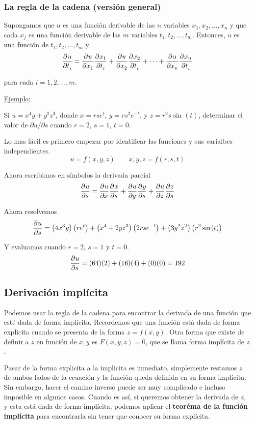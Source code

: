 \documentclass[12pt]{article}
\begin{document}
\subsubsection{La regla de la cadena (versión general)}
Supongamos que $ u $ es una función derivable de las $ n $ variables $ x_{1},x_{2},\dots ,x_{n} $ y que cada $ x_{j} $ es una función derivable de las $ m $ variables $ t_{1},t_{2},\dots ,t_{m} $. Entonces, $ u $ es una función de $ t_{1}, t_{2},\dots,t_{m} $ y
\[
\pdv[]{u}{t_{i}} = \pdv[]{u}{x_{1}}\pdv[]{x_{1}}{t_{i}} + \pdv[]{u}{x_{2}}\pdv[]{x_{2}}{t_{i}} + \dots  + \pdv[]{u}{x_{n}}\pdv[]{x_{n}}{t_{i}}
\]

para cada $ i=1,2,\dots ,m $.

\underline{Ejemplo:}

Si $ u=x^4y+y^2z^3 $, donde $ x=rse^t $, $ y=rs^2e^{-t} $, y $ z=r^2s\sin^{}(t) $, determinar el valor de $ \partial u/\partial s $ cuando $ r=2 $, $ s=1 $, $ t=0 $.

Lo mas fácil es primero empezar por identificar las funciones y sus varialbes independientes.
\[
	u = f(x,y,z) \qquad x,y,z = f(r,s,t)
\]

Ahora escribimos en símbolos la derivada parcial
\[
\pdv[]{u}{s} = \pdv[]{u}{x}\pdv[]{x}{s} + \pdv[]{u}{y}\pdv[]{y}{s} + \pdv[]{u}{z}\pdv[]{z}{s}
\]

Ahora resolvemos
\[
\pdv[]{u}{s} = \left(4x^3y\right)\left(re^t\right) + \left(x^4+2yz^3\right)\left(2rse^{-t}\right) + \left(3y^2z^2\right)\left(r^2\sin^{}(t)\right)
\]

Y evaluamos cuando $ r=2 $, $ s=1 $ y $ t=0 $.
\[
\pdv[]{u}{s} = (64)(2) + (16)(4) + (0)(0) = 192
\]

\subsection{Derivación implícita}
Podemos usar la regla de la cadena para encontrar la derivada de una función que esté dada de forma implícita. Recordemos que una función está dada de forma explícita cuando se presenta de la forma $ z=f(x,y) $. Otra forma que existe de definir a $ z $ en función de $ x,y $ es $ F(x,y,z)=0 $, que se llama forma implícita de $ z $. 

Pasar de la forma explicita a la implicita es inmediato, simplemente restamos $ z $ de ambos lados de la ecuación y la función queda definida en su forma implícita. Sin embargo, hacer el camino inverso puede ser muy complicado e incluso imposible en algunos casos. Cuando es así, si queremos obtener la derivada de $ z $, y esta está dada de forma implícita, podemos aplicar el \textbf{teoréma de la función implícita} para encontrarla sin tener que conocer su forma explícita.
\end{document}
